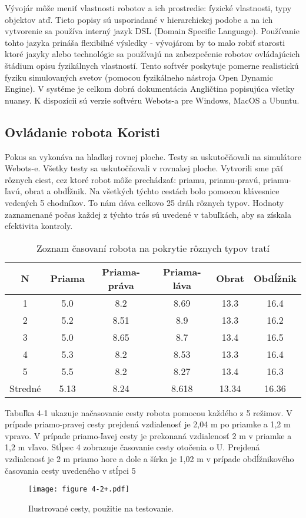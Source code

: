 \justifying
\noindent
Vývojár môže meniť vlastnosti robotov a ich prostredie: fyzické vlastnosti, typy objektov atď. Tieto popisy sú usporiadané v hierarchickej podobe a na ich vytvorenie sa používa interný jazyk DSL (Domain Specific Language).
Používanie tohto jazyka prináša flexibilné výsledky - vývojárom by to malo robiť starosti
ktoré jazyky alebo technológie sa používajú na zabezpečenie robotov ovládajúcich štádium opisu fyzikálnych vlastností.
Tento softvér poskytuje pomerne realistickú fyziku simulovaných svetov (pomocou fyzikálneho nástroja Open Dynamic Engine). V systéme je celkom dobrá dokumentácia
Angličtina popisujúca všetky nuansy. K dispozícii sú verzie softvéru Webots-a pre Windows, MacOS a Ubuntu.

\subsection{Ovládanie robota Koristi}
Pokus sa vykonáva na hladkej rovnej ploche. Testy sa uskutočňovali na simulátore Webots-e. 
Všetky testy sa uskutočňovali v rovnakej ploche. Vytvorili sme päť rôznych ciest, cez ktoré robot môže prechádzať: 
priamu, priamu-pravú, priamu-ľavú, obrat a obdĺžnik. Na všetkých týchto cestách bolo pomocou klávesnice vedených 5 chodníkov. To nám dáva celkovo 25 dráh rôznych typov. Hodnoty zaznamenané počas každej z týchto trás sú uvedené v tabuľkách, aby sa získala efektivita kontroly.
\begin{table}[h!]
\centering
    \begin{tabular}{|c c c c c c|} 
    \hline
    N & Priama & Priama-práva & Priama-láva & Obrat & Obdĺžnik \\ [0.5ex] 
    \hline\hline
    1 & 5.0 & 8.2 & 8.69 & 13.3 & 16.4\\ 
    \hline
    2 & 5.2 & 8.51 & 8.9 & 13.3 & 16.2\\
    \hline
    3 & 5.0 & 8.65 & 8.7 & 13.4 & 16.5\\
    \hline
    4 & 5.3 & 8.2 & 8.53 & 13.3 & 16.4\\
    \hline
    5 & 5.5 & 8.2 & 8.27 & 13.4 & 16.3\\
    \hline
    Stredné & 5.13 & 8.24 & 8.618 & 13.34 & 16.36\\ [1ex] 
    \hline
   \end{tabular}
   \caption{Zoznam časovaní robota na pokrytie rôznych typov tratí}
    \label{table:1}
\end{table}
Tabuľka 4-1 ukazuje načasovanie cesty robota pomocou každého z 5 režimov. 
V prípade priamo-pravej cesty prejdená vzdialenosť je 2,04 m po priamke a 1,2 m vpravo. 
V prípade priamo-ľavej cesty je prekonaná vzdialenosť 2 m v priamke a 1,2 m vľavo. 
Stĺpec 4 zobrazuje časovanie cesty otočenia o U. Prejdená vzdialenosť je 2 m priamo hore a dole a šírka je 1,02 m v prípade obdĺžnikového časovania cesty uvedeného v stĺpci 5
\begin{figure}[ht!]
    \centering
    \texttt{[image: figure 4-2+.pdf]}
    \caption{Ilustrované cesty, použitie na testovanie.}
    \label{o:411}
\end{figure}

